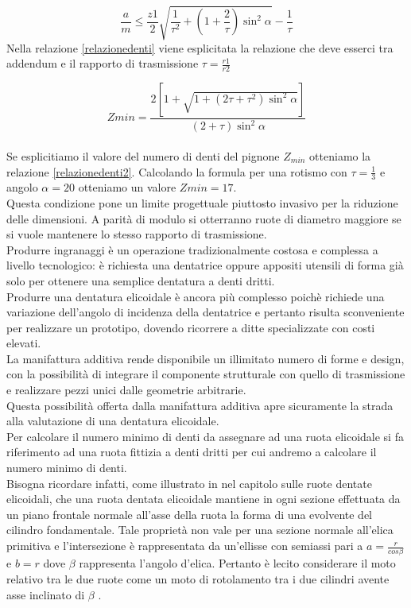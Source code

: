 \documentclass[%
corpo=11pt,
twoside,
 stile=classica,
oldstyle,
greek,%
]{toptesi}
\begin{document}
	\begin{equation}\label{relazionedenti}
	\frac{a}{m}\leq\frac{z1}{2}\sqrt{\frac{1}{\tau^2}+(1+\frac{2}{\tau})\sin^2\alpha} -\frac{1}{\tau}
	\end{equation}
	Nella relazione \ref{relazionedenti} viene esplicitata la relazione che deve esserci tra addendum e il rapporto di trasmissione $\tau=\frac{r1}{r2}$ 
	
	\begin{equation}\label{relazionedenti2}
	Zmin=\frac{2[1+\sqrt{1+(2\tau+\tau^2)\sin^2\alpha}]}{(2+\tau)\sin^2\alpha}
	\end{equation}
	\\Se esplicitiamo il valore del numero di denti del pignone $Z_{min}$ otteniamo la relazione \ref{relazionedenti2}.
	Calcolando la formula per una rotismo con $\tau=\frac{1}{3}$ e angolo $\alpha=20$ otteniamo un valore $Zmin=17$.\\
	Questa condizione pone un limite progettuale piuttosto invasivo per la riduzione delle dimensioni. A parità di modulo si otterranno ruote di diametro maggiore se si vuole mantenere lo stesso rapporto di trasmissione. \\
	Produrre ingranaggi è un operazione tradizionalmente costosa e complessa a livello tecnologico: è richiesta una dentatrice oppure appositi utensili di forma già solo per ottenere una semplice dentatura a denti dritti. \\
	Produrre una dentatura elicoidale è ancora più complesso poichè richiede una variazione dell'angolo di incidenza della dentatrice e pertanto risulta sconveniente per realizzare un prototipo, dovendo ricorrere a ditte specializzate con costi elevati. \\
	La manifattura additiva rende disponibile un illimitato numero di forme e design, con la possibilità di integrare il componente strutturale con quello di trasmissione e realizzare pezzi unici dalle geometrie arbitrarie. \\
	Questa possibilità offerta dalla manifattura additiva apre sicuramente la strada alla valutazione di una dentatura elicoidale. \\
	Per calcolare il numero minimo di denti da assegnare ad una ruota elicoidale si fa riferimento ad una ruota fittizia a denti dritti per cui andremo a calcolare il numero minimo di denti.\\
	Bisogna ricordare infatti, come illustrato in \cite{Jacazioteo} nel capitolo sulle ruote dentate elicoidali, che una ruota dentata elicoidale mantiene in ogni sezione effettuata da un piano frontale normale all'asse della ruota la forma di una evolvente del cilindro fondamentale. Tale proprietà non vale per una sezione normale all'elica primitiva e l'intersezione è rappresentata da un'ellisse con semiassi pari a $a=\frac{r}{cos\beta}$ e $b=r$ dove $\beta$ rappresenta l'angolo d'elica. 
	Pertanto è lecito considerare il moto relativo tra le due ruote come un moto di rotolamento tra i due cilindri avente asse inclinato di $\beta$ .
	
\end{document}
